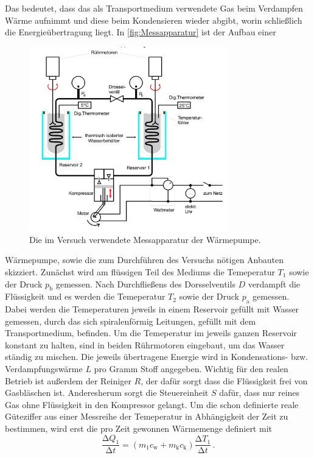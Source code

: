 Das bedeutet, dass das als Transportmedium verwendete Gas beim Verdampfen Wärme 
aufnimmt und diese beim Kondensieren wieder abgibt, worin schließlich die
Energieübertragung liegt. In \autoref{fig:Messapparatur} ist der Aufbau einer
\begin{figure}
    \centering
    \includegraphics[height=8cm]{messdaten/Messapparatur.png}
    \caption{Die im Versuch verwendete Messapparatur der Wärmepumpe. \cite{V206_Anleitung}}
    \label{fig:Messapparatur}
\end{figure}
Wärmepumpe, sowie die zum Durchführen des Versuchs nötigen Anbauten skizziert.
Zunächst wird am flüssigen Teil des Mediums die Temeperatur $T_1$ sowie der Druck
$p_\text{b}$ gemessen. Nach Durchfließens des Dorsselventils $D$ verdampft die 
Flüssigkeit und es werden die Temeperatur $T_2$ sowie der Druck $p_\text{a}$ 
gemessen. Dabei werden die Temeperaturen jeweils in einem Reservoir gefüllt mit 
Wasser gemessen, durch das sich spiralenförmig Leitungen, gefüllt mit dem Transportmedium,
befinden. Um die Temeperatur im jeweils ganzen Reservoir konstant zu halten, sind in beiden 
Rührmotoren eingebaut, um das Wasser ständig zu mischen. Die jeweils übertragene Energie
wird in Kondensations- bzw. Verdampfungswärme $L$ pro Gramm Stoff angegeben.
Wichtig für den realen Betrieb ist außerdem der Reiniger $R$, der dafür sorgt dass die
Flüssigkeit frei von Gasbläschen ist. Anderesherum sorgt die Steuereinheit $S$ dafür,
dass nur reines Gas ohne Flüssigkeit in den Kompressor gelangt.
Um die schon definierte reale Güteziffer aus einer Messreihe der Temeperatur in 
Abhängigkeit der Zeit zu bestimmen, wird erst die pro Zeit gewonnen Wärmemenge definiert mit
\begin{equation}
    \frac{\increment Q_1}{\increment t}=(m_1c_\text{w}+m_\text{k}c_\text{k})\frac{\increment T_1}{\increment t}\,.
\end{equation}
